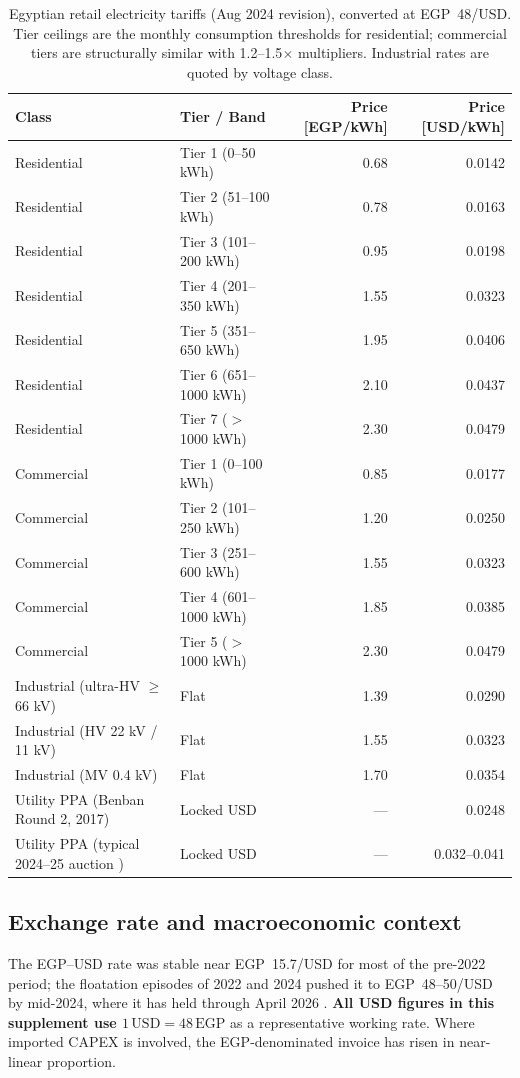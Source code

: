 \documentclass[11pt,a4paper]{article}
\begin{document}
\begin{table}[h]
\centering\small
\caption{Egyptian retail electricity tariffs (Aug 2024 revision), converted at EGP~48/USD. Tier ceilings are the monthly consumption thresholds for residential; commercial tiers are structurally similar with 1.2--1.5$\times$ multipliers. Industrial rates are quoted by voltage class.}
\label{tab:egy_tariffs}
\begin{tabular}{@{}llrr@{}}
\toprule
\textbf{Class} & \textbf{Tier / Band} & \textbf{Price [EGP/kWh]} & \textbf{Price [USD/kWh]}\\
\midrule
Residential & Tier 1 (0--50 kWh)      & 0.68 & 0.0142 \\
Residential & Tier 2 (51--100 kWh)    & 0.78 & 0.0163 \\
Residential & Tier 3 (101--200 kWh)   & 0.95 & 0.0198 \\
Residential & Tier 4 (201--350 kWh)   & 1.55 & 0.0323 \\
Residential & Tier 5 (351--650 kWh)   & 1.95 & 0.0406 \\
Residential & Tier 6 (651--1000 kWh)  & 2.10 & 0.0437 \\
Residential & Tier 7 ($>$1000 kWh)    & 2.30 & 0.0479 \\
\midrule
Commercial & Tier 1 (0--100 kWh)      & 0.85 & 0.0177 \\
Commercial & Tier 2 (101--250 kWh)    & 1.20 & 0.0250 \\
Commercial & Tier 3 (251--600 kWh)    & 1.55 & 0.0323 \\
Commercial & Tier 4 (601--1000 kWh)   & 1.85 & 0.0385 \\
Commercial & Tier 5 ($>$1000 kWh)     & 2.30 & 0.0479 \\
\midrule
Industrial (ultra-HV $\ge$66 kV)      & Flat   & 1.39 & 0.0290 \\
Industrial (HV 22 kV / 11 kV)         & Flat   & 1.55 & 0.0323 \\
Industrial (MV 0.4 kV)                & Flat   & 1.70 & 0.0354 \\
\midrule
Utility PPA (Benban Round 2, 2017)    & Locked USD & --- & 0.0248 \\
Utility PPA (typical 2024--25 auction \citep{nrea_egypt_2024,scatec_obelisk_2024,amea_abydos_2024}) & Locked USD & --- & 0.032--0.041 \\
\bottomrule
\end{tabular}
\end{table}

\subsection{Exchange rate and macroeconomic context}
The EGP--USD rate was stable near EGP~15.7/USD for most of the pre-2022 period; the floatation episodes of 2022 and 2024 pushed it to EGP~48--50/USD by mid-2024, where it has held through April 2026 \citep{cbe_exchange_2026}. \textbf{All USD figures in this supplement use $1\,\mathrm{USD} = 48\,\mathrm{EGP}$} as a representative working rate. Where imported CAPEX is involved, the EGP-denominated invoice has risen in near-linear proportion.
\end{document}
